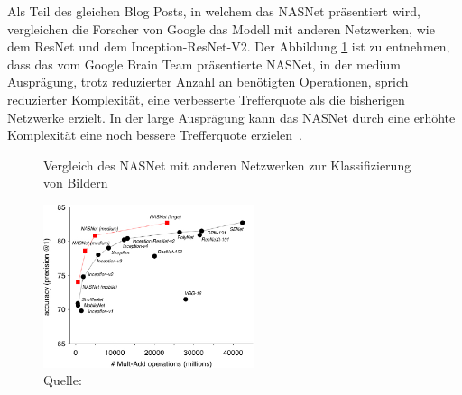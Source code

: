 Als Teil des gleichen Blog Posts, in welchem das NASNet präsentiert wird, vergleichen die Forscher von Google das Modell mit anderen Netzwerken, wie dem ResNet und dem Inception-ResNet-V2. Der Abbildung \ref{nasnet-comparision} ist zu entnehmen, dass das vom Google Brain Team präsentierte NASNet, in der medium Ausprägung, trotz reduzierter Anzahl an benötigten Operationen, sprich reduzierter Komplexität, eine verbesserte Trefferquote als die bisherigen Netzwerke erzielt. In der large Ausprägung kann das NASNet durch eine erhöhte Komplexität eine noch bessere Trefferquote erzielen~\autocite{GoogleNasNet}.

\begin{figure}[h]
    \captionsetup{width=.9\linewidth}
    \caption{Vergleich des NASNet mit anderen Netzwerken zur Klassifizierung von Bildern}
    \label{nasnet-comparision}
    \centering
    \includegraphics[width=0.55\textwidth]{graphics/nasnet-comparision.jpg}
    \caption*{Quelle: \textcite{GoogleNasNet}}
\end{figure}






